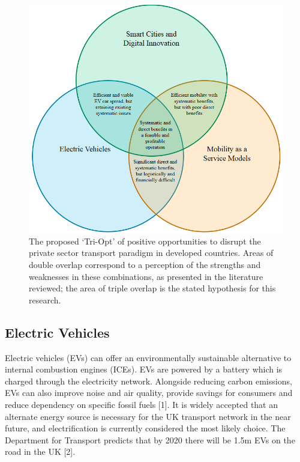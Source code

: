 \documentclass[journal]{IEEEtran}
\begin{document}
\begin{figure}[!htp]
\centering
\includegraphics[width=\columnwidth]{images/triopt.png}
\caption{The proposed `Tri-Opt' of positive opportunities to disrupt
  the private sector transport paradigm in developed countries. Areas
  of double overlap correspond to a perception of the strengths and
  weaknesses in these combinations, as presented in the literature
  reviewed; the area of triple overlap is the stated hypothesis for
  this research.}
\label{fig:triopt}
\end{figure}


\subsection{Electric Vehicles}

Electric vehicles (EVs) can offer an environmentally sustainable
alternative to internal combustion engines (ICEs). EVs are powered by
a battery which is charged through the electricity network. Alongside
reducing carbon emissions, EVs can also improve noise and air quality,
provide savings for consumers and reduce dependency on specific fossil
fuels [1]. It is widely accepted that an alternate energy source is
necessary for the UK transport network in the near future, and
electrification is currently considered the most likely choice. The
Department for Transport predicts that by 2020 there will be 1.5m EVs
on the road in the UK [2].
\end{document}
